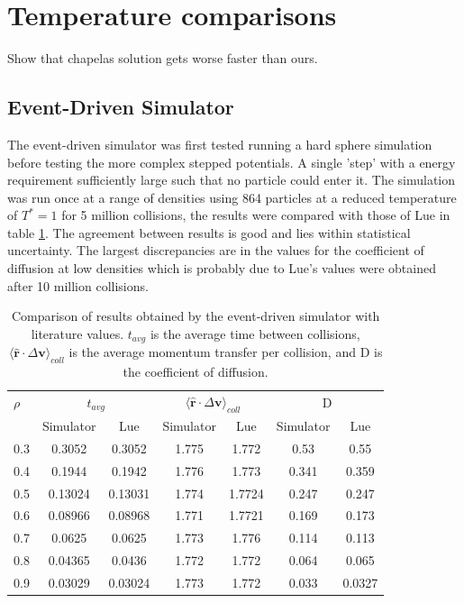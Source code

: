 \documentclass[12pt]{UoAthesis}
\begin{document}
\section{Temperature comparisons}
Show that chapelas solution gets worse faster than ours.

\subsection{Event-Driven Simulator}
 The event-driven simulator was first tested running a hard sphere
 simulation before testing the more complex stepped potentials. A
 single 'step' with a energy requirement sufficiently large such that
 no particle could enter it. The simulation was run once at a range of
 densities using 864 particles at a reduced temperature of $T^*=1$ for
 5 million collisions, the results were compared with those of Lue
 \cite{Lue2005} in table \ref{tab:benchhard}. The agreement between
 results is good and lies within statistical uncertainty. The largest
 discrepancies are in the values for the coefficient of diffusion at
 low densities which is probably due to Lue's values were obtained
 after 10 million collisions.

\begin{table} \caption{Comparison of results obtained by the event-driven
simulator with literature values. $t_{avg}$ is the average time
between collisions, $\langle\mathbf{\hat{r}} \cdot \Delta \mathbf{v}
\rangle_{coll}$ is the average momentum transfer per collision, and D
is the coefficient of
diffusion.} 
\label{tab:benchhard} 
\begin{center} 
  \begin{tabular}{l c c c c c c} 
    \toprule $\rho$ & \multicolumn{2}{c}{$t_{avg}$} &
      \multicolumn{2}{c}{$\langle\mathbf{\hat{r}} \cdot \Delta
        \mathbf{v} \rangle_{coll}$} & \multicolumn{2}{c}{D} \\ 
      \cmidrule(rl{0.75em}){2-3} 
      \cmidrule(rl{0.75em}){4-5}
      \cmidrule(rl{0.75em}){6-7} & Simulator & Lue & Simulator & Lue &
      Simulator & Lue
      \\ \midrule 0.3 & 0.3052 & 0.3052 & 1.775 & 1.772 & 0.53 & 0.55 
      \\ 0.4 & 0.1944 & 0.1942 & 1.776 & 1.773 & 0.341 & 0.359 
      \\ 0.5 & 0.13024 & 0.13031 & 1.774 & 1.7724 & 0.247 & 0.247 
      \\ 0.6 & 0.08966 & 0.08968 & 1.771 & 1.7721 & 0.169 & 0.173 
      \\ 0.7 & 0.0625 & 0.0625 & 1.773 & 1.776 & 0.114 & 0.113
      \\ 0.8 & 0.04365 & 0.0436 & 1.772 & 1.772 & 0.064 & 0.065 
      \\ 0.9 & 0.03029 & 0.03024 & 1.773 & 1.772 & 0.033 & 0.0327
      \\ \bottomrule
    \end{tabular} 
  \end{center} 
\end{table}
\end{document}
